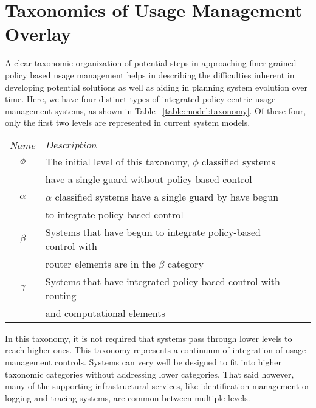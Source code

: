 \section{Taxonomies of Usage Management Overlay}
A clear taxonomic organization of potential steps in approaching finer-grained policy based usage management helps in describing the difficulties inherent in developing potential solutions as well as aiding in planning system evolution over time. Here, we have four distinct types of integrated policy-centric usage management systems, as shown in Table ~\ref{table:model:taxonomy}.  Of these four, only the first two levels are represented in current system models.

\begin{table*}[tp] %
\centering %
\begin{tabular}{clcc}
\toprule %
$ Name$ 	& $Description$ \\\toprule %
$\phi$ 		& The initial level of this taxonomy, $\phi$ classified systems \\
 			& have a single guard without policy-based control \\\midrule
$\alpha$	& $\alpha$ classified systems have a single guard by have begun \\
			& to integrate policy-based control \\\midrule
$\beta$		& Systems that have begun to integrate policy-based control with \\
			& router elements are in the $\beta$ category \\\midrule
$\gamma$	& Systems that have integrated policy-based control with routing \\
			& and computational elements \\\midrule
\end{tabular}
\caption{Proposed Usage Management Taxonomy}
\label{table:model:taxonomy}
\end{table*}

In this taxonomy, it is not required that systems pass through lower levels to reach higher ones.  This taxonomy represents a continuum of integration of usage management controls.  Systems can very well be designed to fit into higher taxonomic categories without addressing lower categories.  That said however, many of the supporting infrastructural services, like identification management or logging and tracing systems, are common between multiple levels.

